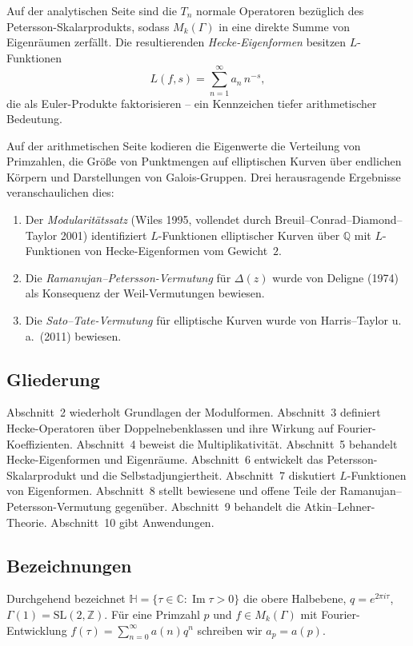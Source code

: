 \documentclass[12pt,a4paper]{amsart}
\theoremstyle{definition}
\begin{document}
Auf der analytischen Seite sind die $T_n$ normale Operatoren bez\"uglich des
Petersson-Skalarprodukts, sodass $M_k(\Gamma)$ in eine direkte Summe von
Eigenr\"aumen zerf\"allt. Die resultierenden \emph{Hecke-Eigenformen} besitzen
$L$-Funktionen
\[
  L(f,s) = \sum_{n=1}^{\infty} a_n\, n^{-s},
\]
die als Euler-Produkte faktorisieren -- ein Kennzeichen tiefer arithmetischer
Bedeutung.

Auf der arithmetischen Seite kodieren die Eigenwerte die Verteilung von
Primzahlen, die Gr\"o{\ss}e von Punktmengen auf elliptischen Kurven \"uber
endlichen K\"orpern und Darstellungen von Galois-Gruppen. Drei herausragende
Ergebnisse veranschaulichen dies:
\begin{enumerate}[label=(\roman*)]
  \item Der \emph{Modularit\"atssatz} (Wiles 1995, vollendet durch
        Breuil--Conrad--Diamond--Taylor 2001) identifiziert $L$-Funktionen
        elliptischer Kurven \"uber $\mathbb{Q}$ mit $L$-Funktionen von
        Hecke-Eigenformen vom Gewicht~$2$.
  \item Die \emph{Ramanujan--Petersson-Vermutung} f\"ur $\Delta(z)$ wurde von
        Deligne (1974) als Konsequenz der Weil-Vermutungen bewiesen.
  \item Die \emph{Sato--Tate-Vermutung} f\"ur elliptische Kurven wurde von
        Harris--Taylor u.\,a.\ (2011) bewiesen.
\end{enumerate}

\subsection*{Gliederung}

Abschnitt~2 wiederholt Grundlagen der Modulformen. Abschnitt~3 definiert
Hecke-Operatoren \"uber Doppelnebenklassen und ihre Wirkung auf
Fourier-Koeffizienten. Abschnitt~4 beweist die Multiplikativit\"at.
Abschnitt~5 behandelt Hecke-Eigenformen und Eigenr\"aume. Abschnitt~6
entwickelt das Petersson-Skalarprodukt und die Selbstadjungiertheit.
Abschnitt~7 diskutiert $L$-Funktionen von Eigenformen. Abschnitt~8
stellt bewiesene und offene Teile der Ramanujan--Petersson-Vermutung gegen\"uber.
Abschnitt~9 behandelt die Atkin--Lehner-Theorie. Abschnitt~10 gibt Anwendungen.

\subsection*{Bezeichnungen}

Durchgehend bezeichnet $\mathbb{H} = \{\tau \in \mathbb{C} : \operatorname{Im}\tau > 0\}$
die obere Halbebene, $q = e^{2\pi i\tau}$, $\Gamma(1) = \mathrm{SL}(2,\mathbb{Z})$.
F\"ur eine Primzahl $p$ und $f \in M_k(\Gamma)$ mit Fourier-Entwicklung
$f(\tau) = \sum_{n=0}^{\infty} a(n) q^n$ schreiben wir $a_p = a(p)$.
\end{document}
